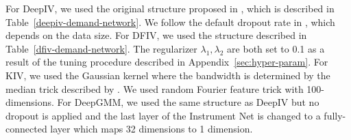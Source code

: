 For DeepIV, we used the original structure proposed in \citet{Hartford2017}, which is described in Table~\ref{deepiv-demand-network}. We follow the default dropout rate in \citet{Hartford2017}, which depends on the data size. For DFIV, we used the structure described in Table~\ref{dfiv-demand-network}. The regularizer $\lambda_1, \lambda_2$ are both set to 0.1 as a result of the tuning procedure described in Appendix~\ref{sec:hyper-param}. For KIV, we used the Gaussian kernel where the bandwidth is determined by the median trick described by \cite{Singh2019}. We used random Fourier feature trick \citep{Rahimi2008} with 100-dimensions. For DeepGMM, we used the same structure as DeepIV but no dropout is applied and the last layer of the Instrument Net is changed to a fully-connected layer which maps 32 dimensions to 1 dimension.

